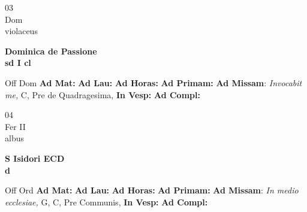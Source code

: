\documentclass[10pt, openany]{book}
\begin{document}
        \begin{center}
            \begin{minipage}{3.5in}
                \vspace{2em}
                \begin{minipage}{0.5in}
                    {\Huge 03} \\
                    {\normalsize Dom} \\
                    {\normalsize violaceus}
                \end{minipage}
                \begin{minipage}{3.0in}
                    \textbf{ \large Dominica de Passione \\
                    \textnormal{\normalsize sd I cl}} \\ 
                \end{minipage}
                \begin{justify}Off Dom
                    \textbf{Ad Mat: }
                    \textbf{Ad Lau: }
                    \textbf{Ad Horas: }
                    \textbf{Ad Primam: }\textbf{Ad Missam}: \textit{Invocabit me,} C, Pre de Quadragesima,  
                    \textbf{In Vesp: }
                    \textbf{Ad Compl: }
                \end{justify}
            \end{minipage}
        \end{center}
    
        \begin{center}
            \begin{minipage}{3.5in}
                \vspace{2em}
                \begin{minipage}{0.5in}
                    {\Huge 04} \\
                    {\normalsize Fer II} \\
                    {\normalsize albus}
                \end{minipage}
                \begin{minipage}{3.0in}
                    \textbf{ \large S Isidori ECD \\
                    \textnormal{\normalsize d}} \\ 
                \end{minipage}
                \begin{justify}Off Ord
                    \textbf{Ad Mat: }
                    \textbf{Ad Lau: }
                    \textbf{Ad Horas: }
                    \textbf{Ad Primam: }\textbf{Ad Missam}: \textit{In medio ecclesiae,} G, C, Pre Communis,  
                    \textbf{In Vesp: }
                    \textbf{Ad Compl: }
                \end{justify}
            \end{minipage}
        \end{center}
    
\end{document}
